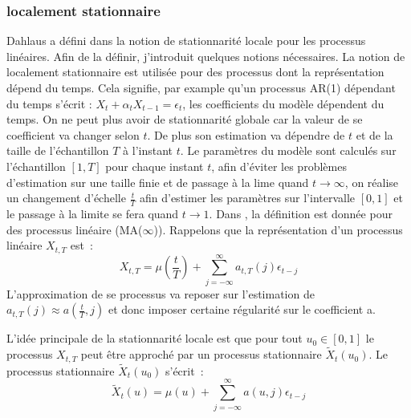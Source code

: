 \documentclass[11pt]{scrartcl} %
\begin{document}
\subsubsection{localement stationnaire}
Dahlaus a défini dans \cite{locally} la notion de stationnarité locale pour les processus linéaires. Afin de la définir, j'introduit quelques notions nécessaires. La notion de localement stationnaire est utilisée pour des processus dont la représentation dépend du temps. Cela signifie, par example qu'un processus AR(1) dépendant du temps s'écrit : $X_t+\alpha_tX_{t-1}=\epsilon_t$, les coefficients du modèle dépendent du temps. On ne peut plus avoir de stationnarité globale car la valeur de se coefficient va changer selon $t$. De plus son estimation va dépendre de $t$ et de la taille de l'échantillon $T$ à l'instant $t$. Le paramètres du modèle sont calculés sur l'échantillon $[1,T]$ pour chaque instant $t$, afin d'éviter les problèmes d'estimation sur une taille finie et de passage à la lime quand $t\rightarrow \infty$, on réalise un changement d'échelle $\frac{t}{T}$ afin d'estimer les paramètres sur l'intervalle $[0,1]$ et le passage à la limite se fera quand $t\rightarrow 1$. Dans \cite{locally}, la définition est donnée pour des processus linéaire (MA($\infty$)). Rappelons que la représentation d'un processus linéaire $X_{t,T}$ est~:
$$
X_{t,T}=\mu\left(\frac{t}{T}\right)+\sum_{j=-\infty}^\infty a_{t,T}(j)\epsilon_{t-j}
$$
L'approximation de se processus va reposer sur l'estimation de $a_{t,T}(j)\approx a(\frac{t}{T},j)$ et donc imposer certaine régularité sur le coefficient a. 


L'idée principale de la stationnarité locale est que pour tout $u_0\in [0,1]$ le processus $X_{t,T}$ peut être approché par un processus stationnaire $\tilde{X}_t(u_0)$. Le processus stationnaire $\tilde{X}_t(u_0)$ s'écrit~:
$$
\tilde{X}_t(u)=\mu(u)+\sum_{j=-\infty}^\infty a(u,j)\epsilon_{t-j}
$$
\end{document}
